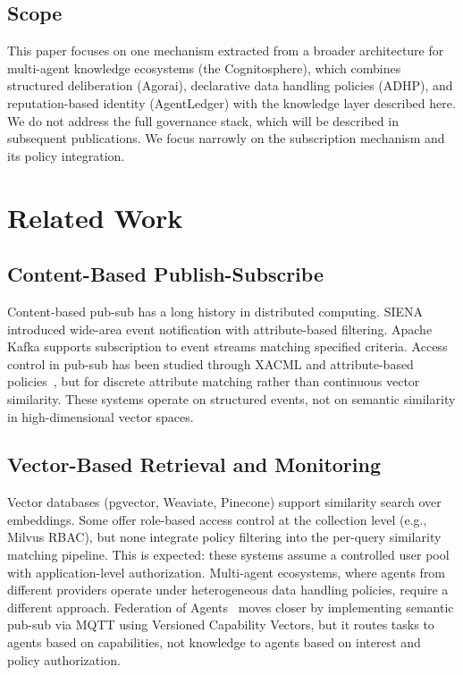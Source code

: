 \documentclass[11pt]{article}
\begin{document}
\subsection{Scope}

This paper focuses on one mechanism extracted from a broader architecture for multi-agent knowledge ecosystems (the Cognitosphere), which combines structured deliberation (Agorai), declarative data handling policies (ADHP), and reputation-based identity (AgentLedger) with the knowledge layer described here. We do not address the full governance stack, which will be described in subsequent publications. We focus narrowly on the subscription mechanism and its policy integration.

\section{Related Work}

\subsection{Content-Based Publish-Subscribe}

Content-based pub-sub has a long history in distributed computing. SIENA~\cite{carzaniga2001} introduced wide-area event notification with attribute-based filtering. Apache Kafka supports subscription to event streams matching specified criteria. Access control in pub-sub has been studied through XACML and attribute-based policies~\cite{bacon2008}, but for discrete attribute matching rather than continuous vector similarity. These systems operate on structured events, not on semantic similarity in high-dimensional vector spaces.

\subsection{Vector-Based Retrieval and Monitoring}

Vector databases (pgvector, Weaviate, Pinecone) support similarity search over embeddings. Some offer role-based access control at the collection level (e.g., Milvus RBAC), but none integrate policy filtering into the per-query similarity matching pipeline. This is expected: these systems assume a controlled user pool with application-level authorization. Multi-agent ecosystems, where agents from different providers operate under heterogeneous data handling policies, require a different approach. Federation of Agents~\cite{giusti2025} moves closer by implementing semantic pub-sub via MQTT using Versioned Capability Vectors, but it routes tasks to agents based on capabilities, not knowledge to agents based on interest and policy authorization.
\end{document}
